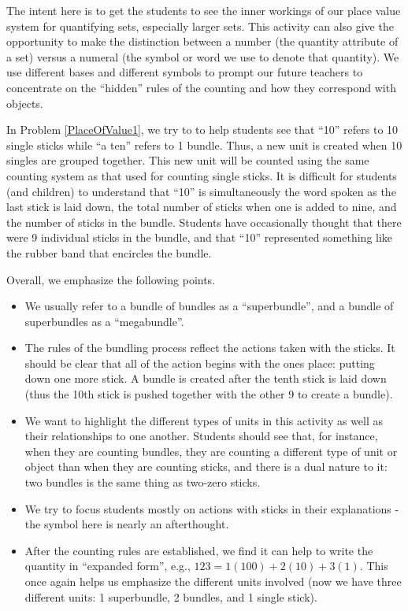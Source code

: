 \documentclass{ximera}
\begin{document}
\newpage
\begin{instructorNotes}
The intent here is to get the students to see the inner workings of our 
place value system for quantifying sets, especially larger sets.  This activity can also give the opportunity to make the distinction between a number (the quantity attribute of a set) versus a numeral (the symbol or word we use to denote that quantity). We use different bases and different symbols to prompt our future teachers 
to concentrate on the ``hidden'' rules of the counting and how they correspond with objects.

In Problem \ref{PlaceOfValue1}, we try to to help students see that ``10'' refers to 10 single sticks while ``a ten'' refers to 1 bundle.  Thus, a new unit is created when 10 singles are grouped together.  This new unit will be counted using the same counting system as that used for counting single sticks.  It is difficult for students (and children) to understand that ``10'' is simultaneously the word spoken as the last stick is laid down, the total number of sticks when one is added to nine, and the number of sticks in the bundle.  Students have occasionally thought that there were 9 individual sticks in the bundle, and that ``10'' represented something like the rubber band that encircles the bundle.

Overall, we emphasize the following points.
\begin{itemize}
    \item We usually refer to a bundle of bundles as a ``superbundle'', and a bundle of superbundles as a ``megabundle''.
	\item The rules of the bundling process reflect the actions taken with the sticks. It should be clear that all of the action begins with the ones place:  putting down one more stick. 
	A bundle is created after the tenth stick is laid down (thus the 10th stick is pushed together with the other 9 to create a bundle).
	\item We want to highlight the different types of units in this activity as well as their relationships to one another.  Students should see that, for instance, when they are counting bundles, they are counting a different type of unit or object than when they are counting sticks, and there is a dual nature to it: two bundles is the same thing as two-zero sticks.
	\item We try to focus students mostly on actions with sticks in their explanations - the symbol here is nearly an afterthought.
	\item After the counting rules are established, we find it can help to write the quantity in ``expanded form'', e.g., $123 = 1(100) + 2(10) + 3(1)$. This once again helps us emphasize the different units involved (now we have three different units: 1 superbundle, 2 bundles, and 1 single stick).


\end{itemize}
\end{instructorNotes}
\end{document}
